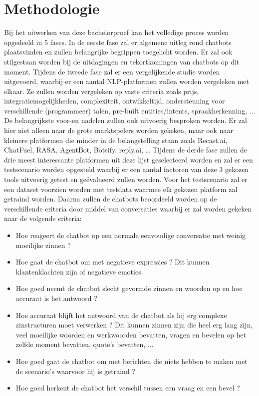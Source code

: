 \section{Methodologie}
\label{sec:methodologie}

Bij het uitwerken van deze bachelorproef kan het volledige proces worden opgedeeld in 5 fases.
In de eerste fase zal er algemene uitleg rond chatbots plaatsvinden en zullen belangrijke begrippen toegelicht worden. Er zal ook stilgestaan worden bij de uitdagingen en tekortkomingen van chatbots op dit moment. Tijdens de tweede fase zal er een vergelijkende studie worden uitgevoerd, waarbij er een aantal NLP-platformen zullen worden vergeleken met elkaar. Ze zullen worden vergeleken op vaste criteria zoals prijs, integratiemogelijkheden, complexiteit, ontwikkeltijd, ondersteuning voor verschillende (programmeer) talen, pre-built entities/intents, spraakherkenning, ... De belangrijkste voor-en nadelen zullen ook uitvoerig besproken worden. Er zal hier niet alleen naar de grote marktspelers worden gekeken, maar ook naar kleinere platformen die minder in de belangstelling staan zoals Recast.ai, ChatFuel, RASA, AgentBot, Botsify, reply.ai, … Tijdens de derde fase zullen de drie meest interessante platformen uit deze lijst geselecteerd worden en zal er een testscenario worden opgesteld waarbij er een aantal factoren van deze 3 gekozen tools uitvoerig getest en geëvalueerd zullen worden. Voor het testscenario zal er een dataset voorzien worden met testdata waarmee elk gekozen platform zal getraind worden. Daarna zullen de chatbots beoordeeld worden op de verschillende criteria door middel van conversaties waarbij er zal worden gekeken naar de volgende criteria:\bigskip

\begin{itemize}
    \item Hoe reageert de chatbot op een normale eenvoudige conversatie met weinig moeilijke zinnen ?
    \item Hoe gaat de chatbot om met negatieve expressies ? Dit kunnen klantenklachten zijn of negatieve emoties.
    \item Hoe goed neemt de chatbot slecht gevormde zinnen en woorden op en hoe accuraat is het antwoord ?
    \item Hoe accuraat blijft het antwoord van de chatbot als hij erg complexe zinstructuren moet verwerken ? Dit kunnen zinnen zijn die heel erg lang zijn, veel moeilijke woorden en werkwoorden bevatten, vragen en bevelen op het zelfde moment bevatten, quote's bevatten, ...
    \item Hoe goed gaat de chatbot om met berichten die niets hebben te maken met de scenario’s waarvoor hij is getraind ?
    \item Hoe goed herkent de chatbot het verschil tussen een vraag en een bevel ?
\end{itemize}


